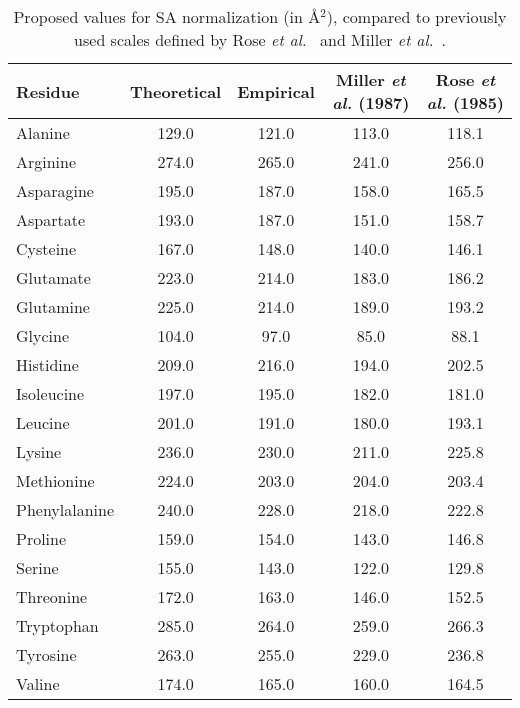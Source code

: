 \documentclass[11pt]{article}
\begin{document}
\begin{table}[H]
\caption{\label{tab:results}Proposed values for SA normalization (in \AA$^2$), compared to previously used scales defined by Rose \emph{et al.}~\cite{Rose1985} and Miller \emph{et al.}~\cite{Miller1987}.}

\begin{center}
\begin{tabular}{lcccc}
Residue & Theoretical & Empirical & Miller \emph{et al.} (1987) & Rose \emph{et al.} (1985) \\
\hline Alanine & 129.0 & 121.0 & 113.0 & 118.1 \\
Arginine        & 274.0 & 265.0 & 241.0 & 256.0 \\
Asparagine    & 195.0 & 187.0 & 158.0 & 165.5 \\
Aspartate      & 193.0 & 187.0 & 151.0 & 158.7 \\
Cysteine        & 167.0 & 148.0 & 140.0 & 146.1 \\
Glutamate     & 223.0 & 214.0 & 183.0 & 186.2 \\
Glutamine      & 225.0 & 214.0 & 189.0 & 193.2  \\
Glycine          & 104.0 & 97.0 & 85.0 & 88.1  \\
Histidine        & 209.0 & 216.0 & 194.0 & 202.5  \\
Isoleucine     & 197.0 & 195.0 & 182.0 & 181.0  \\
Leucine         & 201.0 & 191.0 & 180.0 & 193.1  \\
Lysine           & 236.0 & 230.0 & 211.0 & 225.8  \\
Methionine   & 224.0 & 203.0 & 204.0 & 203.4  \\
Phenylalanine  & 240.0 & 228.0 & 218.0 & 222.8  \\
Proline & 159.0 & 154.0& 143.0 & 146.8  \\
Serine          & 155.0 & 143.0 & 122.0 & 129.8  \\
Threonine          & 172.0 & 163.0 & 146.0 & 152.5  \\
Tryptophan          & 285.0 & 264.0 & 259.0 & 266.3  \\
Tyrosine          & 263.0 & 255.0 & 229.0 & 236.8 \\
Valine          & 174.0 & 165.0 & 160.0 & 164.5  \\
\hline
\end{tabular}
\end{center}
\end{table}
\end{document}
